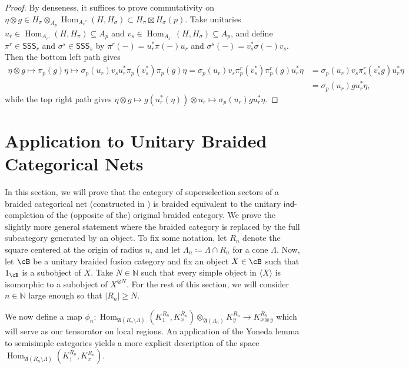 \documentclass[11pt,reqno]{amsart}
\DeclareMathOperator{\Hom}{Hom}
\newcommand{\SSS}{\mathsf{SSS}}
\numberwithin{equation}{section}
\theoremstyle{plain}
\theoremstyle{definition}
\begin{document}
\begin{proof}
    By denseness, it suffices to prove commutativity on $\eta\otimes g\in H_\pi \otimes_{A_p} \Hom_{A_s'}(H, H_\sigma)\subset H_\pi\boxtimes H_\sigma(p)$. Take unitaries $u_r\in\Hom_{A_{r'}}(H,H_\pi)\subseteq A_p$ and $v_s\in\Hom_{A_{s'}}(H,H_\sigma)\subseteq A_p$, and define $\pi^r\in\SSS_r$ and $\sigma^s\in\SSS_s$ by $\pi^r(-)=u_r^*\pi(-)u_r$ and $\sigma^s(-)=v_s^*\sigma(-)v_s$. Then the bottom left path gives
\begin{align*}
    \eta\otimes g\mapsto \pi_p(g)\eta\mapsto \sigma_p(u_r)v_su_r^*\pi_p(v_s^*)\pi_p(g)\eta
    =\sigma_p(u_r)v_s\pi^r_p(v_s^*)\pi^r_p(g)u_r^*\eta
    &=\sigma_p(u_r)v_s\pi^r_s(v_s^*g)u_r^*\eta \\
    &=\sigma_p(u_r)gu_r^*\eta,
\end{align*}
while the top right path gives $\eta\otimes g\mapsto g(u_r^*(\eta))\otimes u_r\mapsto \sigma_p(u_r)gu_r^*\eta$.
\end{proof}
    
\section{Application to Unitary Braided Categorical Nets}\label{sec:braidedcatnets}
In this section, we will prove that the category of superselection sectors of a braided categorical net (constructed in \cite{2506.19969}) is braided equivalent to the unitary $\mathsf{ind}$-completion of the (opposite of the) original braided category. 
We prove the slightly more general statement where the braided category is replaced by the full subcategory generated by an object. To fix some notation, let $R_n$ denote the square centered at the origin of radius $n$, and let $\Lambda_n\coloneq \Lambda \cap R_n$ for a cone $\Lambda$.
Now, let $\cB$ be a unitary braided fusion category and fix an object $X\in\cB$ such that $1_{\cB}$ is a subobject of $X$. 
Take $N\in\mathbb{N}$ such that every simple object in $\langle X\rangle$ is isomorphic to a subobject of $X^{\otimes N}$. 
For the rest of this section, we will consider $n\in\mathbb{N}$ large enough so that $|R_n|\geq N$.

We now define a map $\phi_n:\Hom_{\mathfrak{A}(R_n\setminus \Lambda)}(K_1^{R_n},K_x^{R_n})\otimes_{\mathfrak{A}(\Lambda_n)}K_y^{R_n}\to K_{x\otimes y}^{R_n}$ which will serve as our tensorator on local regions. 
An application of the Yoneda lemma to semisimple categories yields a more explicit description of the space $\Hom_{\mathfrak{A}(R_n\setminus \Lambda)}(K_1^{R_n},K_x^{R_n})$.
\end{document}
